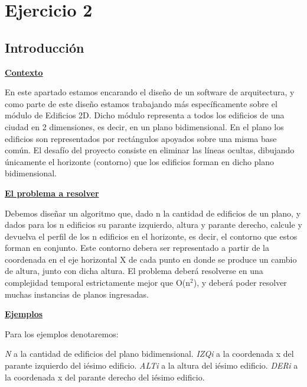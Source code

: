 \section{Ejercicio 2}

\subsection{Introducción}

\noindent \underline{\textbf{Contexto}}

En este apartado estamos encarando el diseño de un software de arquitectura, y como parte de este diseño estamos trabajando más específicamente sobre el módulo de Edificios 2D.
Dicho módulo representa a todos los edificios de una ciudad en 2 dimensiones, es decir, en un plano bidimensional. En el plano los edificios son representados por rectángulos apoyados sobre una misma base común. El desafío del proyecto consiste en eliminar las líneas ocultas, dibujando únicamente el horizonte (contorno) que los edificios forman en dicho plano bidimensional.

\noindent \underline{\textbf{El problema a resolver}}

Debemos diseñar un algoritmo que, dado n la cantidad de edificios de un plano, y dados para los n edificios su parante izquierdo, altura y parante derecho, calcule y devuelva el perfil de los n edificios en el horizonte, es decir, el contorno que estos forman en conjunto.
Este contorno debera ser representado a partir de la coordenada en el eje horizontal X de cada punto en donde se produce un cambio de altura, junto con dicha altura.
El problema deberá resolverse en una complejidad temporal estrictamente mejor que O(n$^2$), y deberá poder resolver muchas instancias de planos ingresadas.

\noindent \underline{\textbf{Ejemplos}}

\noindent Para los ejemplos denotaremos:

\textit{N} a la cantidad de edificios del plano bidimensional. \newline
\indent \textit{IZQi} a la coordenada x del parante izquierdo del iésimo edificio. \newline
\indent \textit{ALTi} a la altura del iésimo edificio. \newline
\indent \textit{DERi} a la coordenada x del parante derecho del iésimo edificio.

